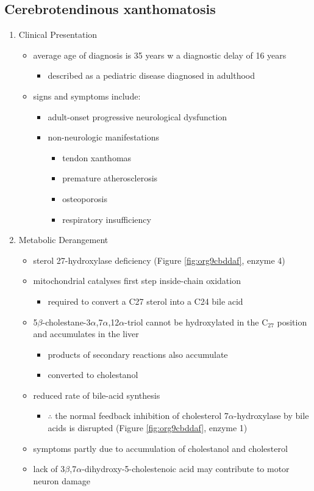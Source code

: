 \documentclass{scrartcl}
\begin{document}
\subsection{Cerebrotendinous xanthomatosis}
\label{sec:org97a3b9c}
\begin{enumerate}
\item Clinical Presentation
\label{sec:org3670ad5}
\begin{itemize}
\item average age of diagnosis is 35 years w a diagnostic delay of 16 years
\begin{itemize}
\item described as a pediatric disease diagnosed in adulthood
\end{itemize}
\item signs and symptoms include:
\begin{itemize}
\item adult-onset progressive neurological dysfunction
\item non-neurologic manifestations
\begin{itemize}
\item tendon xanthomas
\item premature atherosclerosis
\item osteoporosis
\item respiratory insufficiency
\end{itemize}
\end{itemize}
\end{itemize}

\item Metabolic Derangement
\label{sec:org1f54c33}
\begin{itemize}
\item sterol 27-hydroxylase deficiency (Figure \ref{fig:org9cbddaf}, enzyme 4)
\item mitochondrial catalyses first step inside-chain oxidation
\begin{itemize}
\item required to convert a C27 sterol into a C24 bile acid
\end{itemize}
\item 5\(\beta\)-cholestane-3\(\alpha\),7\(\alpha\),12\(\alpha\)-triol cannot be hydroxylated in the C\(_{\text{27}}\)
position and accumulates in the liver
\begin{itemize}
\item products of secondary reactions also accumulate
\item converted to cholestanol
\end{itemize}
\item reduced rate of bile-acid synthesis
\begin{itemize}
\item \(\therefore\) the normal feedback inhibition of cholesterol
7\(\alpha\)-hydroxylase by bile acids is disrupted (Figure \ref{fig:org9cbddaf}, enzyme 1)
\end{itemize}
\item symptoms partly due to accumulation of cholestanol and cholesterol
\item lack of 3\(\beta\),7\(\alpha\)-dihydroxy-5-cholestenoic acid may contribute to motor
neuron damage
\end{itemize}


\end{enumerate}
\end{document}
